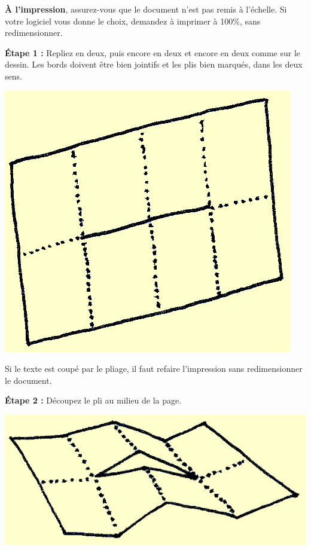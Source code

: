 \documentclass[a4paper,12pt]{article}
\begin{document}
\noindent
\begin{minipage}[b]{.45\linewidth}

\noindent\textbf{À l'impression}, assurez-vous que le document n'est
pas remis à l'échelle. Si votre logiciel vous donne le choix, demandez
à imprimer à 100\%, sans redimensionner.

\bigskip %
\bigskip %
\noindent\textbf{Étape 1 :} Repliez en deux, puis encore en deux et
encore en deux comme sur le dessin. Les bords doivent être bien
jointifs et les plis bien marqués, dans les deux sens.


\medskip \centerline{\includegraphics{img/ptitlivre-etape2.jpg}}

Si le texte est coupé par le pliage, il faut refaire l'impression sans
redimensionner le document.

\medskip

\end{minipage}\hfill\begin{minipage}[b]{.45\linewidth}
\noindent\textbf{Étape 2 :} Découpez le pli au milieu de la page.

\medskip %
\centerline{\includegraphics{img/ptitlivre-etape3.jpg}}
 

\end{minipage}
\end{document}
